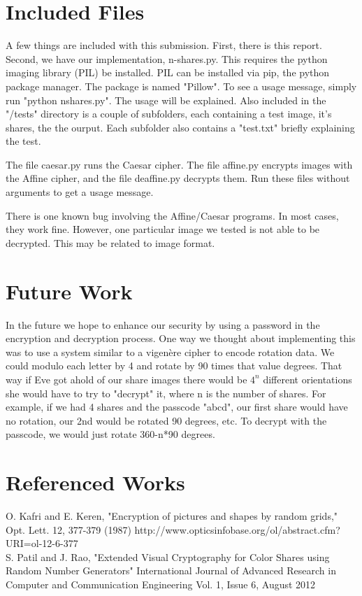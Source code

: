 \documentclass{article}
\begin{document}
\section*{Included Files}
A few things are included with this submission.  First, there is this report.  Second, we have our implementation, n-shares.py. This requires the python imaging library (PIL) be installed.  PIL can be installed via pip, the python package manager.  The package is named "Pillow".  To see a usage message, simply run "python nshares.py".  The usage will be explained.  Also included in the "/tests" directory is a couple of subfolders, each containing a test image, it's shares, the the ourput.  Each subfolder also contains a "test.txt" briefly explaining the test.  

The file caesar.py runs the Caesar cipher.  The file affine.py encrypts images with the Affine cipher, and the file deaffine.py decrypts them.  Run these files without arguments to get a usage message.

There is one known bug involving the Affine/Caesar programs.  In most cases, they work fine.  However, one particular image we tested is not able to be decrypted.  This may be related to image format.
\section*{Future Work}
In the future we hope to enhance our security by using a password in the encryption and decryption process.  One way we thought about implementing this was to use a system similar to a vigenère cipher to encode rotation data.  We could modulo each letter by 4 and rotate by 90 times that value degrees.  That way if Eve got ahold of our share images there would be $4^n$ different orientations she would have to try to "decrypt" it, where n is the number of shares.  For example, if we had 4 shares and the passcode "abcd", our first share would have no rotation, our 2nd would be rotated 90 degrees, etc.  To decrypt with the passcode, we would just rotate 360-n*90 degrees.  
\section*{Referenced Works}
O. Kafri and E. Keren, "Encryption of pictures and shapes by random grids," Opt. Lett. 12, 377-379 (1987) 
http://www.opticsinfobase.org/ol/abstract.cfm?URI=ol-12-6-377
\\

S. Patil and J. Rao, "Extended Visual Cryptography for Color Shares using Random Number Generators" International Journal of Advanced Research in Computer and Communication Engineering 
 Vol. 1, Issue 6, August 2012 
\end{document}
